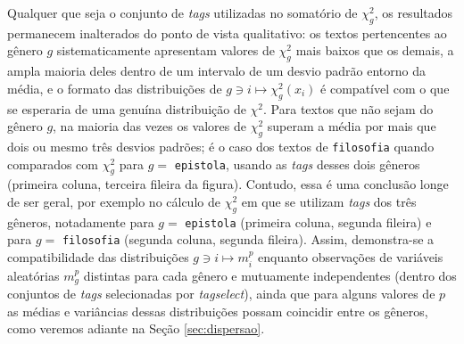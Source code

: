 \documentclass[10pt,a4paper,onecolumn]{article}
\theoremstyle{definition}
\theoremstyle{remark}
\begin{document}
Qualquer que seja o conjunto de \emph{tags} utilizadas no somatório de $\chi^2_g$, os resultados permanecem inalterados do ponto de vista qualitativo: os textos pertencentes ao gênero $g$ sistematicamente apresentam valores de $\chi^2_g$ mais baixos que os demais, a ampla maioria deles dentro de um intervalo de um desvio padrão entorno da média, e o formato das distribuições de $g \ni i \mapsto \chi^2_g(x_i)$ é compatível com o que se esperaria de uma genuína distribuição de $\chi^2$. Para textos que não sejam do gênero $g$, na maioria das vezes os valores de $\chi^2_g$ superam a média por mais que dois ou mesmo três desvios padrões; é o caso dos textos de \texttt{filosofia} quando comparados com $\chi^2_g$ para $g = $ \texttt{epistola}, usando as \emph{tags} desses dois gêneros (primeira coluna, terceira fileira da figura). Contudo, essa é uma conclusão longe de ser geral, por exemplo no cálculo de $\chi^2_g$ em que se utilizam \emph{tags} dos três gêneros, notadamente para $g =$ \texttt{epistola} (primeira coluna, segunda fileira) e para $g = $ \texttt{filosofia}  (segunda coluna, segunda fileira). Assim, demonstra-se a compatibilidade das distribuições $g \ni i \mapsto m^p_i$ enquanto observações de variáveis aleatórias $m_g^p$ distintas para cada gênero e mutuamente independentes (dentro dos conjuntos de \emph{tags} selecionadas por \emph{tagselect}), ainda que para alguns valores de $p$ as médias e variâncias dessas distribuições possam coincidir entre os gêneros, como veremos adiante na Seção \ref{sec:dispersao}.
\end{document}
